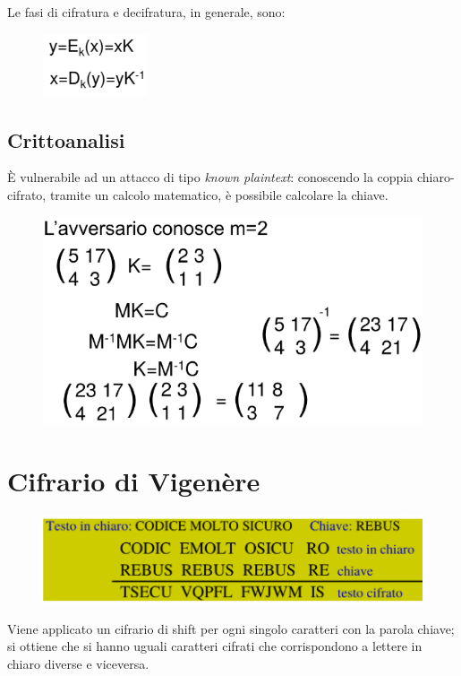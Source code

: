 \noindent Le fasi di cifratura e decifratura, in generale, sono:

\begin{figure}[H]
    \centering 
    \includegraphics[width=0.2\linewidth]{chapters/chap02/images/hill3.png}
\end{figure}

\subsection{Crittoanalisi}
È vulnerabile ad un attacco di tipo \textit{known plaintext}: conoscendo la coppia chiaro-cifrato, tramite 
un calcolo matematico, è possibile calcolare la chiave.

\begin{figure}[H]
    \centering 
    \includegraphics[width=0.65\linewidth]{chapters/chap02/images/hill4.png}
\end{figure}



\section{Cifrario di Vigenère}

\begin{figure}[H]
    \centering
    \includegraphics[width=0.8\linewidth]{chapters/chap02/images/vigenere.png}
\end{figure}

\noindent Viene applicato un cifrario di shift per ogni singolo 
caratteri con la parola chiave; si ottiene che si hanno uguali caratteri 
cifrati che corrispondono a lettere in chiaro diverse e viceversa.

